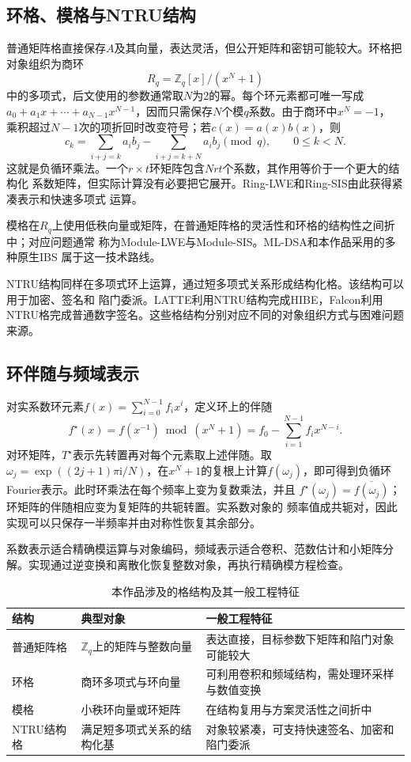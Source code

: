 \subsection{环格、模格与NTRU结构}

普通矩阵格直接保存$A$及其向量，表达灵活，但公开矩阵和密钥可能较大。环格把对象组织为商环
\[
 R_q=\mathbb Z_q[x]/(x^N+1)
\]
中的多项式，后文使用的参数通常取$N$为2的幂。每个环元素都可唯一写成
$a_0+a_1x+\cdots+a_{N-1}x^{N-1}$，因而只需保存$N$个模$q$系数。由于商环中$x^N=-1$，
乘积超过$N-1$次的项折回时改变符号；若$c(x)=a(x)b(x)$，则
\[
 c_k=\sum_{i+j=k}a_i b_j-\sum_{i+j=k+N}a_i b_j\pmod q,
 \qquad 0\leq k<N.
\]
这就是负循环乘法。一个$r\times t$环矩阵包含$Nrt$个系数，其作用等价于一个更大的结构化
系数矩阵，但实际计算没有必要把它展开。Ring-LWE和Ring-SIS由此获得紧凑表示和快速多项式
运算\cite{lpr2013ring}。

模格在$R_q$上使用低秩向量或矩阵，在普通矩阵格的灵活性和环格的结构性之间折中；对应问题通常
称为Module-LWE与Module-SIS\cite{langlois2015module}。ML-DSA和本作品采用的多种原生IBS
属于这一技术路线。

NTRU结构同样在多项式环上运算，通过短多项式关系形成结构化格。该结构可以用于加密、签名和
陷门委派。LATTE利用NTRU结构完成HIBE，Falcon利用NTRU格完成普通数字签名。这些格结构分别对应不同的对象组织方式与困难问题来源。

\subsection{环伴随与频域表示}

对实系数环元素$f(x)=\sum_{i=0}^{N-1}f_i x^i$，定义环上的伴随
\[
 f^\star(x)=f(x^{-1})\bmod(x^N+1)
 =f_0-\sum_{i=1}^{N-1}f_i x^{N-i}.
\]
对环矩阵，$T^\star$表示先转置再对每个元素取上述伴随。取
$\omega_j=\exp((2j+1)\pi\mathrm i/N)$，在$x^N+1$的复根上计算$f(\omega_j)$，即可得到负循环
Fourier表示。此时环乘法在每个频率上变为复数乘法，并且
$f^\star(\omega_j)=\overline{f(\omega_j)}$；环矩阵的伴随相应变为复矩阵的共轭转置。实系数对象的
频率值成共轭对，因此实现可以只保存一半频率并由对称性恢复其余部分。

系数表示适合精确模运算与对象编码，频域表示适合卷积、范数估计和小矩阵分解。实现通过逆变换和离散化恢复整数对象，再执行精确模方程检查。

\begin{table}[H]
\centering\small
\caption{本作品涉及的格结构及其一般工程特征}
\label{tab:lattice-families}
\begin{tabularx}{\textwidth}{@{}p{}p{}X@{}}
\toprule
\rowcolor{black!8} 结构 & 典型对象 & 一般工程特征 \\
\midrule
普通矩阵格 & $\mathbb Z_q$上的矩阵与整数向量 & 表达直接，目标参数下矩阵和陷门对象可能较大 \\
环格 & 商环多项式与环向量 & 可利用卷积和频域结构，需处理环采样与数值变换 \\
模格 & 小秩环向量或环矩阵 & 在结构复用与方案灵活性之间折中 \\
NTRU结构格 & 满足短多项式关系的结构化基 & 对象较紧凑，可支持快速签名、加密和陷门委派 \\
\bottomrule
\end{tabularx}
\end{table}

